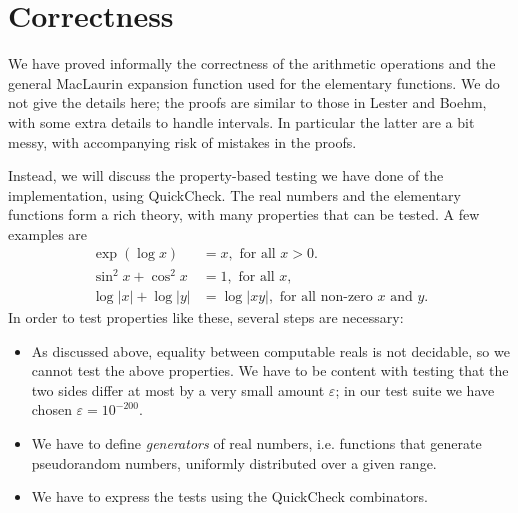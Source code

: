 \documentclass[9pt, a4, twocolumn]{article}
\begin{document}
\section{Correctness}

We have proved informally the correctness of the arithmetic operations
and the general MacLaurin expansion function used for the elementary 
functions. We do not give the details here; the proofs are similar to
those in Lester and Boehm, with some extra details to handle intervals.
In particular the latter are a bit messy, with accompanying risk of
mistakes in the proofs.

Instead, we will discuss the property-based testing we have done of
the implementation, using QuickCheck. The real numbers and the
elementary functions form a rich theory, with many properties that can
be tested. A few examples are
\begin{align*}
  \exp (\log x) &= x, \textrm{ for all } x > 0. \\
  \sin^2 x + \cos^2 x &= 1,  \textrm{ for all } x,\\
   \log |x| + \log |y| &= \log |xy|,  \textrm{ for all non-zero } x \textrm{ and
  } y.
\end{align*}
In order to test properties like these, several steps are necessary:
\begin{itemize}
\item As discussed above, equality between computable reals is not
  decidable, so we cannot test the above properties. We have to be
  content with testing that the two sides differ at most by a very small
  amount $\varepsilon$; in our test suite we have chosen $\varepsilon = 10^{-200}$.
\item  We have to define \emph{generators} of real numbers, i.e. functions
  that generate pseudorandom numbers, uniformly distributed over
  a given range. 
\item We have to express the tests using the QuickCheck combinators.
\end{itemize}
\end{document}
